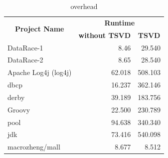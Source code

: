 \begin{table}
	\centering
	\caption{overhead}
	\label{table:overhead}
	\begin{tabular}{|l|rr|}
		\hline
		\multicolumn{1}{|c|}{\multirow{2}{*}{\textbf{Project Name}}}                                 & \multicolumn{2}{c|}{\textbf{Runtime}}                                           \\ \cline{2-3} 
		\multicolumn{1}{|c|}{}                                                                       & \multicolumn{1}{c|}{\textbf{without TSVD}} & \multicolumn{1}{c|}{\textbf{TSVD}} \\ \hline
		DataRace-1                                                                                   & \multicolumn{1}{r|}{8.46}                      &    29.540                                \\ \hline
		DataRace-2                                                                                   & \multicolumn{1}{r|}{8.65}                      &        28.540                            \\ \hline
		Apache Log4j (log4j)                                                                         & \multicolumn{1}{r|}{62.018}                & 508.103                            \\ \hline
		dbcp                                                                                         & \multicolumn{1}{r|}{16.237}                & 362.146                            \\ \hline
		derby                                                                                        & \multicolumn{1}{r|}{39.189}                & 183.756                            \\ \hline
		Groovy                                                                                       & \multicolumn{1}{r|}{22.500}                & 230.789                            \\ \hline
		pool                                                                                         & \multicolumn{1}{r|}{94.638}                & 340.340                            \\ \hline
		jdk                                                                                          & \multicolumn{1}{r|}{73.416}                & 540.098                            \\ \hline
		macrozheng/mall                                                                              & \multicolumn{1}{r|}{8.677}                 & 8.512                              \\ \hline

\end{tabular}
\end{table}
